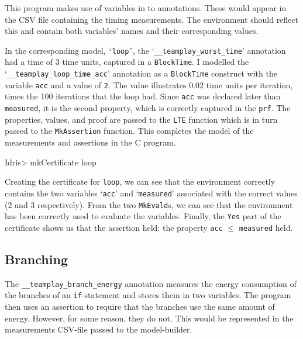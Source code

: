         This program makes use of variables in to annotations. These would appear in the CSV file containing the timing measurements. The environment should reflect this and contain both variables' names and their corresponding values.
        
        \newpage
        
        
        In the corresponding \Idris model, ``\texttt{loop}'', the `\texttt{\_\_teamplay\_worst\_time}' annotation had a time of 3 time units, captured in a \texttt{BlockTime}. I modelled the
        `\texttt{\_\_teamplay\_loop\_time\_acc}' annotation as a \texttt{BlockTime} construct with the variable \texttt{acc} and a value of \texttt{2}. The value illustrates $0.02$ time units per iteration, times the 100 iterations that the loop had. Since \texttt{acc} was declared later than \texttt{measured}, it is the second property, which is correctly captured in the \texttt{prf}. The properties, values, and proof are passed to the \texttt{LTE} function which is in turn passed to the \texttt{MkAssertion} function. This completes the model of the measurements and assertions in the C program.
        
        \begin{code}
Idris> mkCertificate loop
        \end{code}
        
        Creating the certificate for \texttt{loop}, we can see that the environment correctly contains the two variables `\texttt{acc}' and `\texttt{measured}' associated with the correct values (2 and 3 respectively). From the two \texttt{MkEvald}s, we can see that the environment has been correctly used to evaluate the variables. Finally, the \texttt{Yes} part of the certificate shows us that the assertion held: the property \texttt{acc} $\leq$ \texttt{measured} held.
        
    \subsection{Branching}
        
        
        The \texttt{\_\_teamplay\_branch\_energy} annotation measures the energy consumption of the branches of an \texttt{if}-statement and stores them in two variables. The program then uses an assertion to require that the branches use the same amount of energy. However, for some reason, they do not. This would be represented in the measurements CSV-file passed to the model-builder.
        
